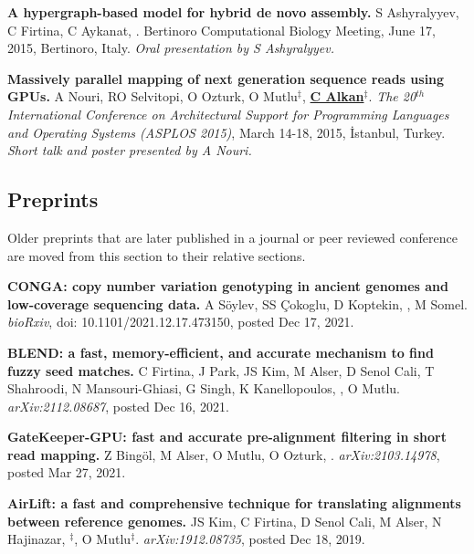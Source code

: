 \vspace{-.2cm}
  {\bf  A hypergraph-based model for hybrid de novo assembly.}
  S Ashyralyyev, C Firtina, C Aykanat, \calkan{}.
  Bertinoro Computational Biology Meeting, June 17, 2015, Bertinoro, Italy. {\it Oral presentation by S Ashyralyyev.}


\vspace{-.2cm}
 {\bf Massively parallel mapping of next generation sequence reads using GPUs.}
  A Nouri, RO Selvitopi, O Ozturk, O Mutlu$^\ddag$, {\bf {\underline{C Alkan}}}$^\ddag$.
{\em The 20$^{th}$ International Conference on Architectural Support for Programming Languages and Operating Systems (ASPLOS 2015)}, 
March 14-18, 2015, İstanbul, Turkey. {\it Short talk and poster presented by A Nouri.}



\vspace{-.4cm}
\subsection{\small \sc  Preprints}
 \vspace{-0.6cm}

\small{
Older preprints that are later published in a journal or peer reviewed conference are moved from this section to their relative sections.
}


\vspace{-.2cm}
{\bf CONGA: copy number variation genotyping in ancient genomes and low-coverage sequencing data.}  A Söylev, SS Çokoglu, D Koptekin, \calkan{}, M Somel. 
{\it bioRxiv}, doi: 10.1101/2021.12.17.473150, posted Dec 17, 2021.

\vspace{-.2cm}
{\bf BLEND: a fast, memory-efficient, and accurate mechanism to find fuzzy seed matches.}
C Firtina, J Park, JS Kim, M Alser, D Senol Cali, T Shahroodi, N Mansouri-Ghiasi, G Singh, K Kanellopoulos, \calkan{}, O Mutlu.
{\it arXiv:2112.08687}, posted Dec 16, 2021.

\vspace{-.2cm}
{\bf GateKeeper-GPU: fast and accurate pre-alignment filtering in short read mapping.}
Z Bingöl, M Alser, O Mutlu, O Ozturk, \calkan{}.
{\it arXiv:2103.14978}, posted Mar 27, 2021.


\vspace{-.2cm}
{\bf AirLift: a fast and comprehensive technique for translating alignments between reference genomes.} JS Kim, C Firtina, D Senol Cali, M Alser, N Hajinazar, \calkan{}$^\ddag$, O Mutlu$^\ddag$. {\it arXiv:1912.08735}, posted Dec 18, 2019.



